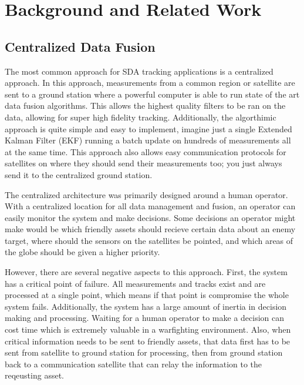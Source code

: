 \section{Background and Related Work}

\subsection{Centralized Data Fusion}


The most common approach for SDA tracking applications is a centralized approach. 
In this approach, measurements from a common region or satellite are sent to a ground station where a powerful computer is able to run state of the art data fusion algorithms.
This allows the highest quality filters to be ran on the data, allowing for super high fidelity tracking. 
Additionally, the algorthimic approach is quite simple and easy to implement, imagine just a single Extended Kalman Filter (EKF) \cite{b5} running a batch update on hundreds of measurements all at the same time.
This approach also allows easy communication protocols for satellites on where they should send their measurements too; you just always send it to the centralized ground station.

The centralized architecture was primarily designed around a human operator. With a centralized location for all data management and fusion, an operator can easily monitor the system and make decisions.
Some decisions an operator might make would be which friendly assets should recieve certain data about an enemy target, where should the sensors on the satellites be pointed, and which areas of the globe should be given a higher priority.

However, there are several negative aspects to this approach. First, the system has a critical point of failure. All measurements and tracks exist and are processed at a single point,
which means if that point is compromise the whole system fails. Additionally, the system has a large amount of inertia in decision making and processing. Waiting for a human operator to make a decision can cost time which is extremely valuable in a warfighting environment.
Also, when critical information needs to be sent to friendly assets, that data first has to be sent from satellite to ground station for processing, then from ground station back to a communication satellite that can relay the information to the reqeusting asset.

